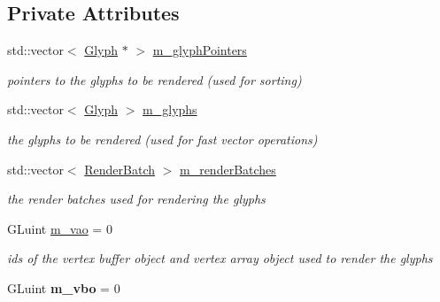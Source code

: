 \subsection*{Private Attributes}
\begin{DoxyCompactItemize}
\item 
\mbox{\label{classnta_1_1SpriteBatch_ae6c42878b427eef6fcd07aad0a60c6aa}} 
std\+::vector$<$ \hyperlink{structnta_1_1Glyph}{Glyph} $\ast$ $>$ \hyperlink{classnta_1_1SpriteBatch_ae6c42878b427eef6fcd07aad0a60c6aa}{m\+\_\+glyph\+Pointers}
\begin{DoxyCompactList}\small\item\em pointers to the glyphs to be rendered (used for sorting) \end{DoxyCompactList}\item 
\mbox{\label{classnta_1_1SpriteBatch_ac8291bea20d3a963bbe006587f35bf6f}} 
std\+::vector$<$ \hyperlink{structnta_1_1Glyph}{Glyph} $>$ \hyperlink{classnta_1_1SpriteBatch_ac8291bea20d3a963bbe006587f35bf6f}{m\+\_\+glyphs}
\begin{DoxyCompactList}\small\item\em the glyphs to be rendered (used for fast vector operations) \end{DoxyCompactList}\item 
\mbox{\label{classnta_1_1SpriteBatch_ae194b160a5de1c3a45ccebc570acd4b5}} 
std\+::vector$<$ \hyperlink{structnta_1_1RenderBatch}{Render\+Batch} $>$ \hyperlink{classnta_1_1SpriteBatch_ae194b160a5de1c3a45ccebc570acd4b5}{m\+\_\+render\+Batches}
\begin{DoxyCompactList}\small\item\em the render batches used for rendering the glyphs \end{DoxyCompactList}\item 
\mbox{\label{classnta_1_1SpriteBatch_ad0606266e8d335e3e10692f64ece5a77}} 
G\+Luint \hyperlink{classnta_1_1SpriteBatch_ad0606266e8d335e3e10692f64ece5a77}{m\+\_\+vao} = 0
\begin{DoxyCompactList}\small\item\em ids of the vertex buffer object and vertex array object used to render the glyphs \end{DoxyCompactList}\item 
\mbox{\label{classnta_1_1SpriteBatch_a80916f3903da74581339d9295d454367}} 
G\+Luint {\bfseries m\+\_\+vbo} = 0
\end{DoxyCompactItemize}


